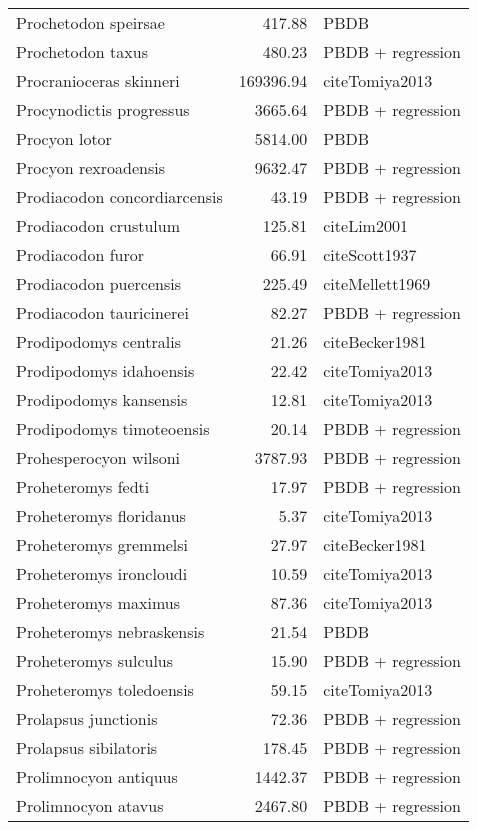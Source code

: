 \begin{table}[ht]
\begin{tabular}{lrl}
  Prochetodon speirsae & 417.88 & PBDB \\ 
  Prochetodon taxus & 480.23 & PBDB + regression \\ 
  Procranioceras skinneri & 169396.94 & cite{Tomiya2013} \\ 
  Procynodictis progressus & 3665.64 & PBDB + regression \\ 
  Procyon lotor & 5814.00 & PBDB \\ 
  Procyon rexroadensis & 9632.47 & PBDB + regression \\ 
  Prodiacodon concordiarcensis & 43.19 & PBDB + regression \\ 
  Prodiacodon crustulum & 125.81 & cite{Lim2001} \\ 
  Prodiacodon furor & 66.91 & cite{Scott1937} \\ 
  Prodiacodon puercensis & 225.49 & cite{Mellett1969} \\ 
  Prodiacodon tauricinerei & 82.27 & PBDB + regression \\ 
  Prodipodomys centralis & 21.26 & cite{Becker1981} \\ 
  Prodipodomys idahoensis & 22.42 & cite{Tomiya2013} \\ 
  Prodipodomys kansensis & 12.81 & cite{Tomiya2013} \\ 
  Prodipodomys timoteoensis & 20.14 & PBDB + regression \\ 
  Prohesperocyon wilsoni & 3787.93 & PBDB + regression \\ 
  Proheteromys fedti & 17.97 & PBDB + regression \\ 
  Proheteromys floridanus & 5.37 & cite{Tomiya2013} \\ 
  Proheteromys gremmelsi & 27.97 & cite{Becker1981} \\ 
  Proheteromys ironcloudi & 10.59 & cite{Tomiya2013} \\ 
  Proheteromys maximus & 87.36 & cite{Tomiya2013} \\ 
  Proheteromys nebraskensis & 21.54 & PBDB \\ 
  Proheteromys sulculus & 15.90 & PBDB + regression \\ 
  Proheteromys toledoensis & 59.15 & cite{Tomiya2013} \\ 
  Prolapsus junctionis & 72.36 & PBDB + regression \\ 
  Prolapsus sibilatoris & 178.45 & PBDB + regression \\ 
  Prolimnocyon antiquus & 1442.37 & PBDB + regression \\ 
  Prolimnocyon atavus & 2467.80 & PBDB + regression \\ 

\end{tabular}
\end{table}
